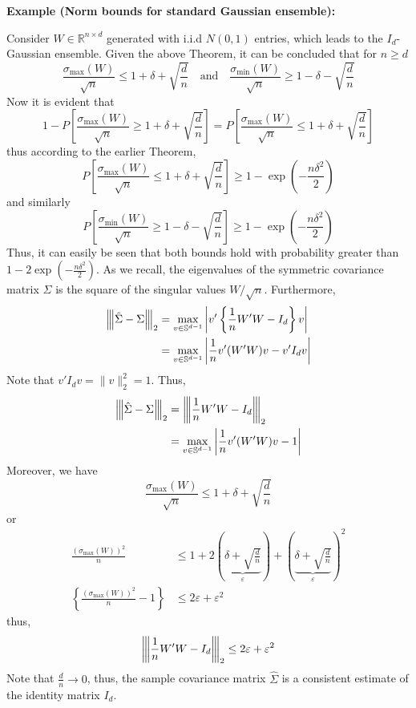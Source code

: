 \documentclass[10pt,handout,english]{beamer}
\newcommand{\R}{\mathbb{R}}
\renewcommand{\S}{\mathbb{S}}
\newcommand{\vertiii}[1]{{\left\vert\kern-0.25ex\left\vert\kern-0.25ex\left\vert #1 
    \right\vert\kern-0.25ex\right\vert\kern-0.25ex\right\vert}}
\begin{document}
\begin{frame}[allowframebreaks]
\textbf{Example (Norm bounds for standard Gaussian ensemble):} 

Consider $W\in\R^{n\times d}$ generated with i.i.d $N(0,1)$ entries, which leads to the $I_d$-Gaussian ensemble. Given the above Theorem, it can be concluded that for $n\geq d$
\[
\frac{\sigma_{\max}(W)}{\sqrt{n}}\leq 1+\delta+\sqrt{\frac{d}{n}}\quad\text{and}\quad \frac{\sigma_{\min}(W)}{\sqrt{n}}\geq 1-\delta-\sqrt{\frac{d}{n}}
\]
Now it is evident that
\[
1-P\left[\frac{\sigma_{\max}(W)}{\sqrt{n}}\geq 1+\delta+\sqrt{\frac{d}{n}}\right]=
P\left[\frac{\sigma_{\max}(W)}{\sqrt{n}}\leq 1+\delta+\sqrt{\frac{d}{n}}\right]
\]
thus according to the earlier Theorem,
 \[
P\left[\frac{\sigma_{\max}(W)}{\sqrt{n}}\leq 1+\delta+\sqrt{\frac{d}{n}}\right]\geq1- \exp{\left(-\frac{n\delta^2}{2}\right)}
\]
and similarly
 \[
P\left[\frac{\sigma_{\min}(W)}{\sqrt{n}}\geq 1-\delta-\sqrt{\frac{d}{n}}\right]\geq 1-\exp{\left(-\frac{n\delta^2}{2}\right)}
\]
Thus, it can easily be seen that both bounds hold with probability greater than $1-2\exp\left(-\frac{n\delta^2}{2}\right)$. As we recall, the eigenvalues of the symmetric covariance matrix $\hat{\Sigma}$ is the square of the singular values $W/\sqrt{n}$. Furthermore,
\begin{align*}
\vertiii{\hat{\Sigma}-\Sigma}_2&=\max_{v\in \S^{d-1}}\left\lvert v'\left\{\frac{1}{n}W'W-I_d\right\}v\right\rvert\\
&=\max_{v\in \S^{d-1}}\left\lvert \frac{1}{n}v'(W'W)v-v'I_dv\right\rvert
\end{align*}
Note that $v'I_dv=\lVert v\rVert_2^2=1$. Thus,
\begin{align*}
\vertiii{\hat{\Sigma}-\Sigma}_2&=\vertiii{\frac{1}{n}W'W-I_d}_2\\
&=\max_{v\in \S^{d-1}}\left\lvert \frac{1}{n}v'(W'W)v-1\right\rvert
\end{align*}
Moreover, we have
\[
\frac{\sigma_{\max}(W)}{\sqrt{n}}\leq 1+\delta+\sqrt{\frac{d}{n}}
\]
or
\begin{align*}
\frac{(\sigma_{\max}(W))^2}{n}&\leq1+2\left(\underbrace{\delta+\sqrt{\frac{d}{n}}}_{\varepsilon}\right)+ \left(\underbrace{\delta+\sqrt{\frac{d}{n}}}_{\varepsilon}\right)^2\\
\left\{\frac{(\sigma_{\max}(W))^2}{n}-1\right\}&\leq2\varepsilon+ \varepsilon^2
\end{align*}
thus,
\[
\vertiii{\frac{1}{n}W'W-I_d}_2\leq 2\varepsilon+\varepsilon^2
\]
Note that $\frac{d}{n}\to 0$, thus, the sample covariance matrix $\hat{\Sigma}$ is a consistent estimate of the identity matrix $I_d$.
\end{frame}
\end{document}

